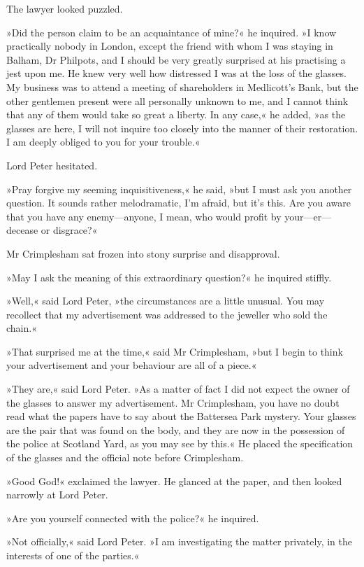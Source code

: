The lawyer looked puzzled.

»Did the person claim to be an acquaintance of mine?« he inquired. »I know practically nobody in London, except the friend with whom I was staying in Balham, Dr Philpots, and I should be very greatly surprised at his practising a jest upon me. He knew very well how distressed I was at the loss of the glasses. My business was to attend a meeting of shareholders in Medlicott's Bank, but the other gentlemen present were all personally unknown to me, and I cannot think that any of them would take so great a liberty. In any case,« he added, »as the glasses are here, I will not inquire too closely into the manner of their restoration. I am deeply obliged to you for your trouble.«

Lord Peter hesitated.

»Pray forgive my seeming inquisitiveness,« he said, »but I must ask you another question. It sounds rather melodramatic, I'm afraid, but it's this. Are you aware that you have any enemy—anyone, I mean, who would profit by your—er—decease or disgrace?«

Mr Crimplesham sat frozen into stony surprise and disapproval.

»May I ask the meaning of this extraordinary question?« he inquired stiffly.

»Well,« said Lord Peter, »the circumstances are a little unusual. You may recollect that my advertisement was addressed to the jeweller who sold the chain.«

»That surprised me at the time,« said Mr Crimplesham, »but I begin to think your advertisement and your behaviour are all of a piece.«

»They are,« said Lord Peter. »As a matter of fact I did not expect the owner of the glasses to answer my advertisement. Mr Crimplesham, you have no doubt read what the papers have to say about the Battersea Park mystery. Your glasses are the pair that was found on the body, and they are now in the possession of the police at Scotland Yard, as you may see by this.« He placed the specification of the glasses and the official note before Crimplesham.

»Good God!« exclaimed the lawyer. He glanced at the paper, and then looked narrowly at Lord Peter.

»Are you yourself connected with the police?« he inquired.

»Not officially,« said Lord Peter. »I am investigating the matter privately, in the interests of one of the parties.«

